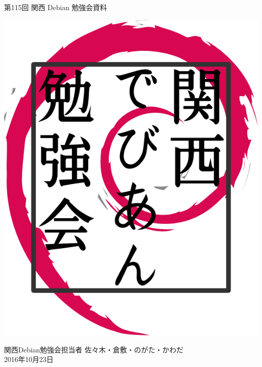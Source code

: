 \documentclass[mingoth,a4paper]{jsarticle}
\newcommand{\debmtgyear}{2016}
\newcommand{\debmtgdate}{23}
\newcommand{\debmtgmonth}{10}
\newcommand{\debmtgnumber}{115}
\begin{document}
\begin{titlepage}


  第\debmtgnumber{}回 関西 Debian 勉強会資料

  \vspace{2cm}

  \begin{center}
    \includegraphics{image200802/kansaidebianlogo.png}
  \end{center}

  \begin{flushright}
    \hfill{}関西Debian勉強会担当者 佐々木・倉敷・のがた・かわだ \\
    \hfill{}\debmtgyear{}年\debmtgmonth{}月\debmtgdate{}日
  \end{flushright}

  \thispagestyle{empty}
\end{titlepage}

\end{document}
